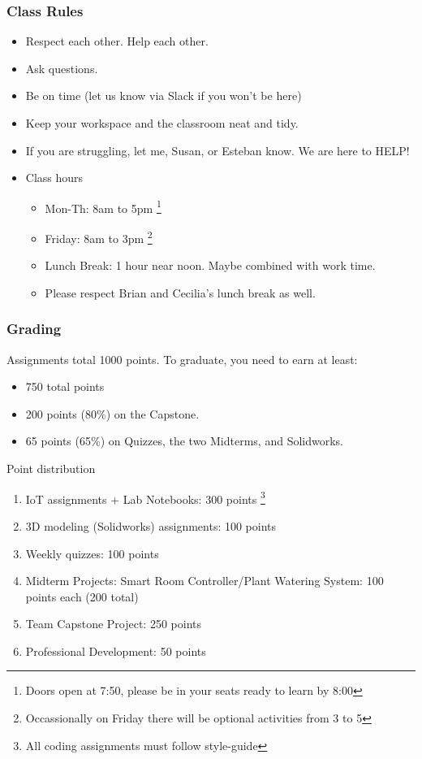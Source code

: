 \documentclass{beamer}
\begin{document}
\begin{frame}\frametitle{Class Rules}
\begin{itemize}
\item Respect each other. Help each other.
\item Ask questions. 
\item Be on time (let us know via Slack if you won't be here) 
\item Keep your workspace and the classroom neat and tidy.
\item If you are struggling, let me, Susan, or Esteban know. We are here to HELP!

\item Class hours
\begin{itemize}
	\item Mon-Th: 8am to 5pm \footnote{Doors open at 7:50, please be in your seats ready to learn by 8:00}
	\item Friday: 8am to 3pm \footnote{Occassionally on Friday there will be optional activities from 3 to 5}
	\item Lunch Break: 1 hour near noon. Maybe combined with work time. 
	\item Please respect Brian and Cecilia's lunch break as well.
\end{itemize}
\end{itemize}
\end{frame}

\begin{frame}\frametitle{Grading}
Assignments total 1000 points. To graduate, you need to earn at least:
\begin{itemize}
\item 750 total points
\item 200 points (80\%) on the Capstone.
\item 65 points (65\%) on Quizzes, the two Midterms, and Solidworks.
\end{itemize}


\vspace{0.25cm}
Point distribution
\begin{enumerate}
\item IoT assignments + Lab Notebooks: 300 points \footnote{All coding assignments must follow style-guide}
\item 3D modeling (Solidworks) assignments: 100 points
\item Weekly quizzes: 100 points
\item Midterm Projects: Smart Room Controller/Plant Watering System: 100 points each (200 total)
\item Team Capstone Project: 250 points
\item Professional Development: 50 points
\end{enumerate}
\end{frame}
\end{document}
